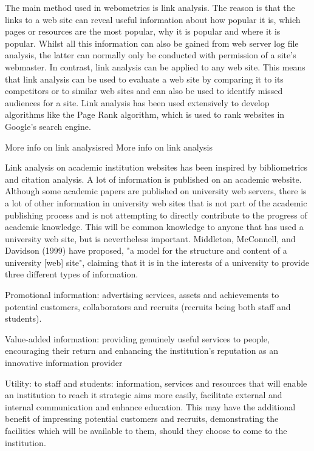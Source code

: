 The main method used in webometrics is link analysis. The reason is that the links to a web site can reveal useful information about how popular it is, which pages or resources are the most popular, why it is popular and where it is popular. Whilst all this information can also be gained from web server log file analysis, the latter can normally only be conducted with permission of a site’s webmaster. In contrast, link analysis can be applied to any web site. This means that link analysis can be used to evaluate a web site by comparing it to its competitors or to similar web sites and can also be used to identify missed audiences for a site. Link analysis has been used extensively to develop algorithms like the Page Rank algorithm, which is used to rank websites in Google’s search engine.
\begin{review_comment}{More info on link analysis}{red}
{More info on link analysis}
\end{review_comment}
Link analysis on academic institution websites has been inspired by bibliometrics and citation
analysis. A lot of information is published on an academic website. Although some academic papers are published on university web servers, there is a lot of other information in university web sites that is not part of the academic publishing process and is not attempting to directly contribute to the progress of academic knowledge. This will be common knowledge to anyone that has used a university web site, but is nevertheless important. Middleton, McConnell, and Davidson (1999) have proposed, "a model for the structure and content of a university [web] site", claiming that it is in the interests of a university to provide three different types of information.
\begin{list}{}{}
\item Promotional information: advertising services, assets and achievements to potential customers, collaborators and recruits (recruits being both staff and students).
\item Value-added information: providing genuinely useful services to people, encouraging their return and enhancing the institution's reputation as an innovative information provider
\item Utility: to staff and students: information, services and resources that will enable an institution to reach it strategic aims more easily, facilitate external and internal communication and enhance education. This may have the additional benefit of impressing potential customers and recruits, demonstrating the facilities which will be available to them, should they choose to come to the institution.
\end{list}

